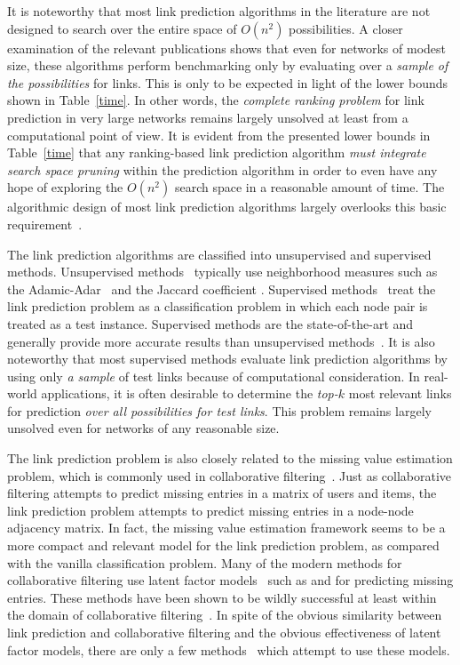 It is noteworthy that most link prediction algorithms in the
literature are not designed to search over the entire space of
$O(n^2)$ possibilities. A closer examination of the relevant
publications shows that even for networks of modest size, these
algorithms perform benchmarking only by evaluating over a {\em
sample of the possibilities} for links. This is only to be expected
in light of the lower bounds shown in Table~\ref{time}.  In other
words, the {\em complete ranking problem} for link prediction in
very large networks remains largely unsolved at least from a
computational point of view. It is evident from the presented lower
bounds in Table~\ref{time} that any ranking-based link prediction
algorithm {\em must integrate search space pruning} within the
prediction algorithm in order to even  have any  hope of exploring
the $O(n^2)$ search space in a reasonable amount of time. The
algorithmic design of most link prediction algorithms largely
overlooks this basic requirement~\cite{chancc,propflow}.

The link prediction algorithms are classified into unsupervised and
supervised methods. Unsupervised methods~\cite{kleinberg} typically
use neighborhood measures such as the Adamic-Adar~\cite{adamic} and
the Jaccard coefficient \cite{kleinberg}. Supervised methods~\cite{propflow} treat the
link prediction problem as a classification problem in which each node pair
is treated as a test instance. Supervised methods are the
state-of-the-art and generally provide more accurate results than
unsupervised methods~\cite{propflow}. It is also noteworthy that
most supervised methods evaluate link prediction algorithms by using
only {\em a sample} of test links because of computational
consideration.  In real-world applications, it is often desirable to
determine the {\em top-$k$} most relevant links for prediction {\em
over all possibilities for test links}. This problem remains largely
unsolved even for networks of any reasonable size.

The link prediction problem is also closely related to the missing value
estimation problem, which is commonly used in collaborative
filtering~\cite{adom}.  Just as collaborative filtering attempts to
predict missing entries in a matrix of users and items, the link
prediction problem attempts to predict missing entries in a
node-node adjacency matrix. In fact, the missing value estimation
framework seems to be a more compact and relevant model for the link
prediction problem, as compared with the vanilla classification
problem.  Many of the modern methods for collaborative filtering use
latent factor models~\cite{conceptualr,web} such as \SVD and
\NMF for predicting missing entries. These methods have been
shown to be wildly successful at least within the domain of
collaborative filtering~\cite{web}. In spite of the obvious
similarity between link prediction and collaborative filtering and
the obvious effectiveness of latent factor models, there are only a
few methods~\cite{menon} which attempt to use these models.

